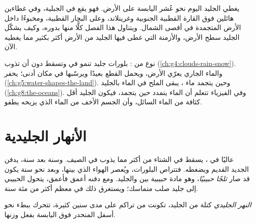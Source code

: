يغطي الجليد اليوم نحو عُشر اليابسة على الأرض. فهو يقع في  الجبلية، وفي
غطاءين هائلين فوق القارة القطبية الجنوبية وغرينلاند، وعلى البحار القطبية،
ومخبوءًا داخل الأرض المتجمدة في أقصى الشمال. ويتناول هذا الفصل كلًّا منها
بدوره، وكيف يشكّل الجليد سطح الأرض، والأزمنة التي غطى فيها الجليد من الأرض
أكثر بكثير مما يغطيه الآن.

\begin{recall}
 نوع من : بلورات جليد تنمو في  وتسقط دون أن تذوب
(\cref{ch:g4:clouds-rain-snow}). والماء الجاري يعرّي الأرض، ويحمل القطع بعيدًا
ويرسّبها في مكان أدنى؛  يحفر  (\cref{ch:g5:water-shapes-the-land}).
وحين يتجمد ماء ، يبقى الملح في الماء  بالجليد
(\cref{ch:g8:the-oceans}). وفي الفيزياء تتعلم أن الماء يتمدد حين يتجمد، فيكون
الجليد أقل كثافة من الماء السائل، وأن الجسم الأخف من الماء الذي يزيحه
يطفو.
\end{recall}

\section{الأنهار الجليدية}

عاليًا في ، يسقط في الشتاء من  أكثر مما يذوب في الصيف. وسنة بعد
سنة، يدفن  الجديد  القديم ويضغطه. فتتراص البلورات، ويُعصر الهواء
الذي بينها، وبعد نحو سنة يكون  قد صار \emph{ثلجًا حبيبيًا}، وهو مادة
حبيبية بين  والجليد. ومع دفنه أعمق فأعمق، يتحول  الحبيبي إلى جليد
صلب متماسك؛ ويستغرق ذلك في معظم  أكثر من مئة سنة.

\begin{definition}\label{def:g8:ice-on-earth:glacier}
\emph{النهر الجليدي} كتلة من الجليد، تكونت من  تراكم على
مدى سنين كثيرة، تتحرك ببطء نحو أسفل المنحدر فوق اليابسة بفعل وزنها.
\end{definition}

